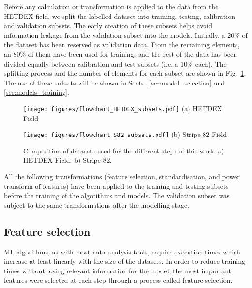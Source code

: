 \documentclass{aa}
\begin{document}
Before any calculation or transformation is applied to the data from the HETDEX field, we split the labelled dataset into training, testing, calibration, and validation subsets. The early creation of these subsets helps avoid information leakage from the validation subset into the models. Initially, a $20 \%$ of the dataset has been reserved as validation data. From the remaining elements, an $80 \%$ of them have been used for training, and the rest of the data has been divided equally between calibration and test subsets (i.e. a $10 \%$ each). The splitting process and the number of elements for each subset are shown in Fig.~\ref{fig:dataset_sizes}. The use of these subsets will be shown in Sects.~\ref{sec:model_selection} and \ref{sec:models_training}.

\begin{figure}
  \centering
  \begin{minipage}{0.29\textwidth}
    \centering
    \texttt{[image: figures/flowchart\_HETDEX\_subsets.pdf]}\hfill\break
    {(a) HETDEX Field}
  \end{minipage}
  \hfill
  \begin{minipage}{0.19\textwidth}
    \centering
    \texttt{[image: figures/flowchart\_S82\_subsets.pdf]}
    \vspace{4.5cm}\hfill\break
    {(b) Stripe 82 Field}
  \end{minipage}
  \caption{Composition of datasets used for the different steps of this work. a) HETDEX Field. b) Stripe 82.}
  \label{fig:dataset_sizes}
\end{figure}

All the following transformations (feature selection, standardisation, and power transform of features) have been applied to the training and testing subsets before the training of the algorithms and models. 
The validation subset was subject to the same transformations after the modelling stage.


\subsection{Feature selection}\label{sec:feat_selection}

ML algorithms, as with most data analysis tools, require execution times which increase at least linearly with the size of the datasets. In order to reduce training times without losing relevant information for the model, the most important features were selected at each step through a process called feature selection. 
\end{document}
